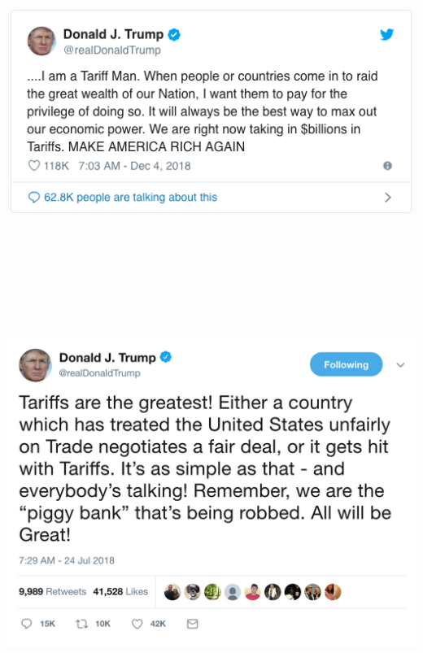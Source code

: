 \documentclass[
  ignorenonframetext,
]{beamer}
\begin{document}
\begin{frame}{}
\protect\hypertarget{section-3}{}
\includegraphics[width=\textwidth,height=4.6875in]{figures/tariff_man.png}
\end{frame}

\begin{frame}{}
\protect\hypertarget{section-4}{}
\includegraphics[width=\textwidth,height=4.6875in]{figures/trump_tariffs_tweet.jpeg}
\end{frame}
\end{document}
